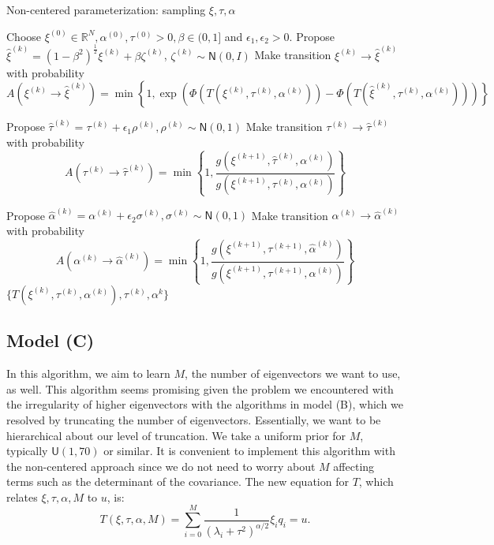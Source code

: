 \documentclass{siamart1116}
\begin{document}
        \begin{algorithm}
        \caption{Non-centered parameterization: sampling $\xi, \tau, \alpha$}
        \label{alg:xi_tau_alpha}
        \begin{algorithmic}[1]
        \State Choose $\xi^{(0)} \in \mathbb{R}^N, \alpha^{(0)}, \tau^{(0)} > 0, \beta \in (0, 1]$ and $\epsilon_1, \epsilon_2 > 0$.
        \State Propose $\hat\xi^{(k)} = (1-\beta^2)^{\frac{1}{2}}\xi^{(k)} + \beta \zeta^{(k)}$, $\zeta^{(k)} \sim \mathsf{N}(0, I)$
        \State Make transition $\xi^{(k)} \to \hat\xi^{(k)}$ with probability
        \[ A(\xi^{(k)} \to \hat\xi^{(k)}) = \min\left\{1, \exp\left(\Phi(T(\xi^{(k)},\tau^{(k)},\alpha^{(k)})) - \Phi(T(\hat\xi^{(k)},\tau^{(k)},\alpha^{(k)}))\right) \right\}\] 

        \State Propose $\hat\tau^{(k)} = \tau^{(k)} + \epsilon_1 \rho^{(k)}, \rho^{(k)} \sim \mathsf{N}(0,1)$
        \State Make transition $\tau^{(k)} \to \hat\tau^{(k)}$ with probability
        \[ A(\tau^{(k)} \to \hat\tau^{(k)}) = \min\left\{1, \frac{g(\xi^{(k+1)},\hat\tau^{(k)},\alpha^{(k)})}{g(\xi^{(k+1)},\tau^{(k)},\alpha^{(k)})} \right\}\] 

        \State Propose $\hat\alpha^{(k)} = \alpha^{(k)} + \epsilon_2 \sigma^{(k)}, \sigma^{(k)} \sim \mathsf{N}(0,1)$
        \State Make transition $\alpha^{(k)} \to \hat\alpha^{(k)}$ with probability
        \[ A(\alpha^{(k)} \to \hat\alpha^{(k)}) = \min\left\{1, \frac{g(\xi^{(k+1)},\tau^{(k+1)},\hat \alpha^{(k)})}{g(\xi^{(k+1)},\tau^{(k+1)},\alpha^{(k)})} \right\}\]
        \EndFor
        \State \Return $\{ T(\xi^{(k)},\tau^{(k)},\alpha^{(k)}), \tau^{(k)}, \alpha^{k} \}$
        \end{algorithmic}
        \end{algorithm}

    \subsection{Model (C)}
        In this algorithm, we aim to learn $M$, the number of eigenvectors we want to use, as well. This algorithm seems promising given the problem we encountered with the irregularity of higher eigenvectors with the algorithms in model (B), which we resolved by truncating the number of eigenvectors. Essentially, we want to be hierarchical about our level of truncation. We take a uniform prior for $M$, typically $\mathsf{U}(1,70)$ or similar. It is convenient to implement this algorithm with the non-centered approach since we do not need to worry about $M$ affecting terms such as the determinant of the covariance. The new equation for $T$, which relates $\xi, \tau, \alpha, M$ to $u$, is:
        \begin{equation}
            \label{eqn:noncentered_T_M}
            T(\xi,\tau,\alpha, M) = \sum_{i=0}^M \frac{1}{(\lambda_i+\tau^2)^{\alpha/2}}\xi_iq_i = u.
        \end{equation}
\end{document}
